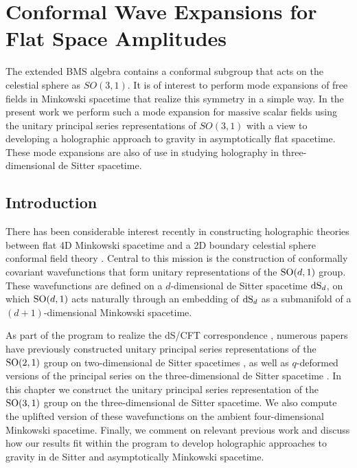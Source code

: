 \documentclass{brownthesis}
\begin{document}
\chapter{Conformal Wave Expansions for Flat Space Amplitudes}\label{chap:flatspace}
The extended BMS algebra contains a conformal subgroup that acts on
the celestial sphere as $SO(3,1)$. It is of interest to perform mode
expansions of free fields in Minkowski spacetime that realize this
symmetry in a simple way. In the present work we perform such a mode
expansion for massive scalar fields using the unitary principal series
representations of $SO(3,1)$ with a view to developing a holographic
approach to gravity in asymptotically flat spacetime. These mode expansions
are also of use in studying holography in three-dimensional de Sitter
spacetime.

\section{Introduction}

There has been considerable interest recently in constructing holographic
theories between flat 4D Minkowski spacetime and a 2D boundary celestial
sphere conformal field theory \cite{deBoer:2003vf,Kapec:2014opa,Kapec:2016jld,Cheung:2016iub}.
Central to this mission is the construction of conformally covariant
wavefunctions that form unitary representations of the ${\rm SO}(d,1)$
group. These wavefunctions are defined on a $d$-dimensional de Sitter
spacetime ${\rm dS}_{d}$, on which ${\rm SO}(d,1)$ acts naturally
through an embedding of ${\rm dS}_{d}$ as a submanifold of a $(d+1)$-dimensional
Minkowski spacetime.

As part of the program to realize the dS/CFT correspondence \cite{Strominger:2001pn},
numerous papers have previously constructed unitary principal series
representations of the ${\rm SO(2,1)}$ group on two-dimensional de
Sitter spacetimes \cite{Guijosa:2003ze,Guijosa:2005qi}, as well
as $q$-deformed versions of the principal series on the three-dimensional
de Sitter spacetime \cite{Lowe:2004nw}. In this chapter we construct
the unitary principal series representation of the ${\rm SO(3,1)}$
group on the three-dimensional de Sitter spacetime. We also compute
the uplifted version of these wavefunctions on the ambient four-dimensional
Minkowski spacetime. Finally, we comment on relevant previous work
\cite{Pasterski:2016qvg,Pasterski:2017kqt,Pasterski:2017ylz} and
discuss how our results fit within the program to develop holographic
approaches to gravity in de Sitter and asymptotically Minkowski spacetime.
\end{document}
